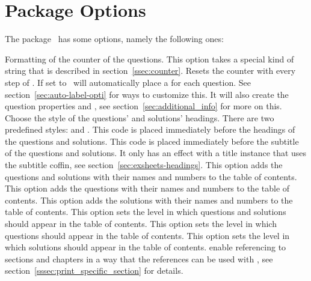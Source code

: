 \documentclass[load-preamble+,scrartcl={DIV10}]{cnltx-doc}
\begin{document}
\section{Package Options}\label{sec:options}
The package \ExSheets\ has some options, namely the following ones:
\begin{options}
    Formatting of the counter of the questions.  This option takes a special
    kind of string that is described in section~\ref{ssec:counter}.
  \Default
    Resets the  counter with every step of .
    If set to  \ExSheets\ will automatically place a
     for each question.  See
    section~\ref{sec:auto-label-opti} for ways to customize this.  It will
    also create the question properties  and , see
    section~\ref{sec:additional_info} for more on this.
    Choose the style of the questions' and solutions' headings.  There are two
    predefined styles:  and .
    This code is placed immediately before the headings of the questions and
    solutions.
    This code is placed immediately before the subtitle of the questions and
    solutions.  It only has an effect with a title instance that uses the
    subtitle coffin, see section~\ref{sec:exsheets-headings}.
    This option adds the questions and solutions with their names and numbers
    to the table of contents.
    This option adds the questions with their names and numbers to the table
    of contents.
    This option adds the solutions with their names and numbers to the table
    of contents.
    This option sets the level in which questions and solutions should appear
    in the table of contents.
    This option sets the level in which questions should appear in the table
    of contents.
    This option sets the level in which solutions should appear in the table
    of contents.
    enable referencing to sections and chapters in a way that the references
    can be used with , see
    section~\ref{sssec:print_specific_section} for details.
\end{options}
\end{document}
